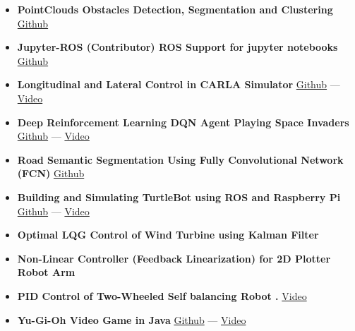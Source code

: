 \documentclass[10pt,a4paper,ragged2e]{altacv}
\begin{document}
\begin{itemize}
\item \textbf{PointClouds Obstacles Detection, Segmentation and Clustering}
\href{https://github.com/HemaZ/SFND_Lidar_Obstacle_Detection}{Github}

\item \textbf{Jupyter-ROS (Contributor)  ROS Support for jupyter notebooks}
\href{https://github.com/RoboStack/jupyter-ros}{Github}

\item \textbf{Longitudinal and Lateral Control in CARLA Simulator}
\href{https://github.com/HemaZ/carla-longlat-control}{Github} --- \href{https://www.youtube.com/watch?v=_ONfGpo1h-4}{Video}

\item \textbf{Deep Reinforcement Learning DQN Agent Playing Space Invaders }
\href{https://github.com/HemaZ/Deep-Reinforcement-Learning}{Github} --- \href{https://www.youtube.com/watch?v=yR3SW-NdS-k&t=3s}{Video}

\item \textbf{Road Semantic Segmentation Using Fully Convolutional Network (FCN) }
\href{https://github.com/HemaZ/sem-seg}{Github}

\item \textbf{Building and Simulating TurtleBot using ROS and Raspberry Pi}
\href{https://github.com/HemaZ/AMR_ROS}{Github} --- \href{https://www.youtube.com/watch?v=ThAjbMSuvAo}{Video}
\item \textbf{Optimal LQG Control of Wind Turbine using
Kalman Filter}

\item \textbf{Non-Linear Controller (Feedback Linearization) for 2D Plotter Robot Arm}

\item \textbf{PID Control of Two-Wheeled Self balancing Robot .}
\href{https://www.youtube.com/watch?v=lp5exim_Jro}{Video}

\item \textbf{Yu-Gi-Oh Video Game in Java}
\href{https://github.com/HemaZ/yu-gi-oh-java}{Github} --- \href{https://www.youtube.com/watch?v=wY9EOFwh1F0}{Video}
\end{itemize}


\divider


\divider


\end{document}
